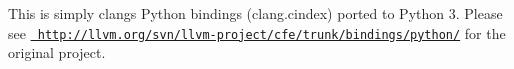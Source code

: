 This is simply clang\textquotesingle{}s Python bindings (clang.\+cindex) ported to Python 3. Please see \href{http://llvm.org/svn/llvm-project/cfe/trunk/bindings/python/}{\texttt{ http\+://llvm.\+org/svn/llvm-\/project/cfe/trunk/bindings/python/}} for the original project. 